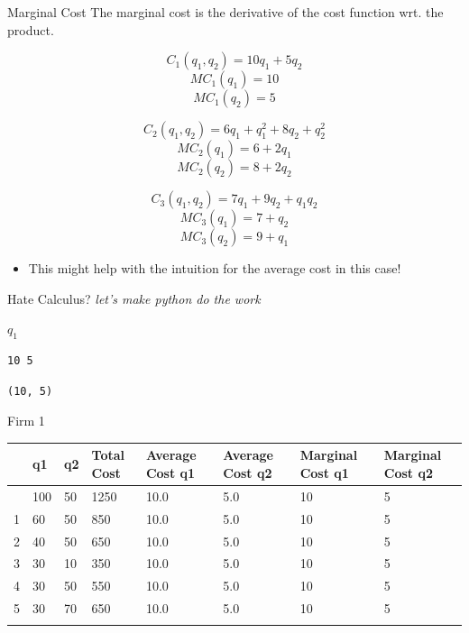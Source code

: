 \documentclass[
  ignorenonframetext,
]{beamer}
\providecommand{\tightlist}{%
  \setlength{\itemsep}{0pt}\setlength{\parskip}{0pt}}\usepackage{longtable,booktabs,array}
\begin{document}
\begin{frame}{Marginal Cost}
\label{marginal-cost}
The marginal cost is the derivative of the cost function wrt. the
product.

\pause

\[C_1(q_1, q_2) = 10q_1 + 5q_2\] \[MC_1(q_1) = 10\] \[MC_1(q_2) = 5\]

\pause

\[C_2(q_1, q_2) = 6q_1 + q_1^2 + 8q_2 + q_2^2\] \[MC_2(q_1) = 6 + 2q_1\]
\[MC_2(q_2) = 8 + 2q_2\]

\pause

\[C_3(q_1, q_2) = 7q_1 + 9q_2 + q_1q_2\] \[MC_3(q_1) = 7 + q_2\]
\[MC_3(q_2) = 9 + q_1\]

\begin{itemize}
\tightlist
\item
  This might help with the intuition for the average cost in this case!
\end{itemize}
\end{frame}

\begin{frame}[fragile]
\begin{block}{Hate Calculus?}
\label{hate-calculus}
\emph{let's make python do the work}

\pause

$\displaystyle q_{1}$

\pause

\begin{verbatim}
10 5
\end{verbatim}

\pause

\begin{verbatim}
(10, 5)
\end{verbatim}
\end{block}
\end{frame}

\begin{frame}{Firm 1}
\label{firm-1-1}
\begin{longtable}[]{@{}llllllll@{}}
\toprule\noalign{}
& q1 & q2 & Total Cost & Average Cost q1 & Average Cost q2 & Marginal
Cost q1 & Marginal Cost q2 \\
\midrule\noalign{}
\endhead
0 & 100 & 50 & 1250 & 10.0 & 5.0 & 10 & 5 \\
1 & 60 & 50 & 850 & 10.0 & 5.0 & 10 & 5 \\
2 & 40 & 50 & 650 & 10.0 & 5.0 & 10 & 5 \\
3 & 30 & 10 & 350 & 10.0 & 5.0 & 10 & 5 \\
4 & 30 & 50 & 550 & 10.0 & 5.0 & 10 & 5 \\
5 & 30 & 70 & 650 & 10.0 & 5.0 & 10 & 5 \\
\bottomrule\noalign{}
\end{longtable}
\end{frame}
\end{document}
